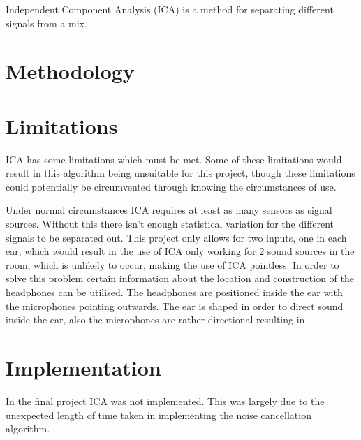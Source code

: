 Independent Component Analysis (ICA) is a method for separating different signals from a mix.

\section{Methodology}

\section{Limitations}
ICA has some limitations which must be met.
Some of these limitations would result in this algorithm being unsuitable for this project, though these limitations could potentially be circumvented through knowing the circumstances of use.

Under normal circumstances ICA requires at least as many sensors as signal sources.
Without this there isn't enough statistical variation for the different signals to be separated out.
This project only allows for two inputs, one in each ear, which would result in the use of ICA only working for 2 sound sources in the room, which is unlikely to occur, making the use of ICA pointless.
In order to solve this problem certain information about the location and construction of the headphones can be utilised.
The headphones are positioned inside the ear with the microphones pointing outwards.
The ear is shaped in order to direct sound inside the ear, also the microphones are rather directional resulting in 

\section{Implementation}
In the final project ICA was not implemented.
This was largely due to the unexpected length of time taken in implementing the noise cancellation algorithm.
